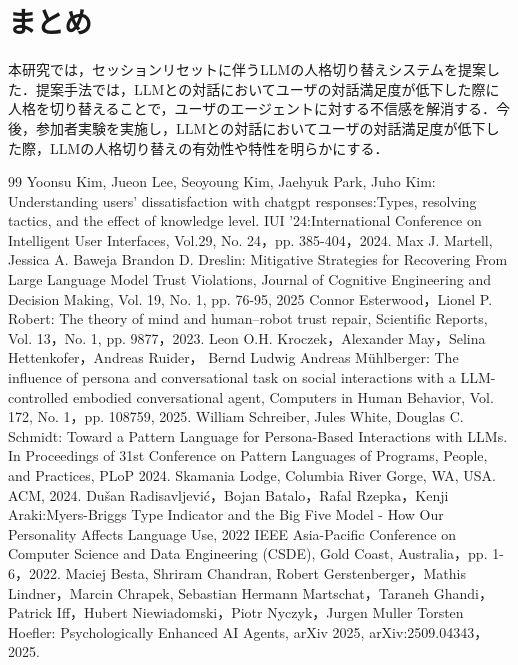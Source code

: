 \documentclass[a4paper,10pt,twocolumn]{myjarticle2}
\begin{document}
\section{まとめ}
本研究では，セッションリセットに伴うLLMの人格切り替えシステムを提案した．提案手法では，LLMとの対話においてユーザの対話満足度が低下した際に人格を切り替えることで，ユーザのエージェントに対する不信感を解消する．今後，参加者実験を実施し，LLMとの対話においてユーザの対話満足度が低下した際，LLMの人格切り替えの有効性や特性を明らかにする．

\footnotesize
\begin{thebibliography}{99}
\vspace{1zh}
Yoonsu Kim, Jueon Lee, Seoyoung Kim, Jaehyuk Park, Juho Kim: Understanding users’ dissatisfaction with
chatgpt responses:Types, resolving tactics, and the effect of knowledge level. IUI '24:International Conference on Intelligent User Interfaces, Vol.29, No. 24，pp. 385-404，2024.
Max J. Martell, Jessica A. Baweja Brandon D. Dreslin: Mitigative Strategies for Recovering From Large Language Model Trust Violations, Journal of Cognitive Engineering and Decision Making, Vol. 19, No. 1, pp. 76-95, 2025
Connor Esterwood，Lionel P. Robert: The theory of mind and human–robot trust repair, Scientific Reports, Vol. 13，No. 1, pp. 9877，2023.
 Leon O.H. Kroczek，Alexander May，Selina Hettenkofer，Andreas Ruider， Bernd Ludwig Andreas Mühlberger: The influence of persona and conversational task on social interactions with a LLM-controlled embodied conversational agent,  Computers in Human Behavior, Vol. 172, No. 1，pp. 108759, 2025.
William Schreiber, Jules White, Douglas C. Schmidt: Toward a Pattern Language for Persona-Based Interactions with LLMs. In Proceedings of 31st Conference on Pattern Languages of Programs, People, and Practices, PLoP 2024. Skamania Lodge, Columbia River Gorge, WA, USA. ACM, 2024. 
 Dušan Radisavljević，Bojan Batalo，Rafal Rzepka，Kenji Araki:Myers-Briggs Type Indicator and the Big Five Model - How Our Personality Affects Language Use, 2022 IEEE Asia-Pacific Conference on Computer Science and Data Engineering (CSDE), Gold Coast, Australia，pp. 1-6，2022. 
Maciej Besta, Shriram Chandran, Robert Gerstenberger，Mathis Lindner，Marcin Chrapek, Sebastian Hermann Martschat，Taraneh Ghandi，Patrick Iff，Hubert Niewiadomski，Piotr Nyczyk，Jurgen Muller Torsten Hoefler: Psychologically Enhanced AI Agents, arXiv 2025, arXiv:2509.04343，2025. 

\end{thebibliography}
\end{document}
